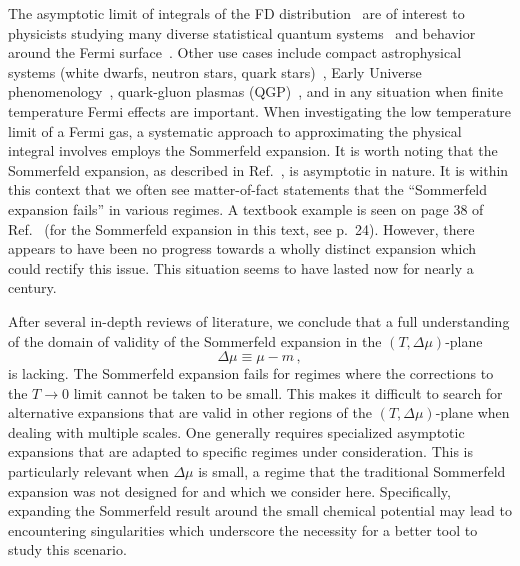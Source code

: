 \documentclass[sn-mathphys,Numbered]{sn-jnl}
\begin{document}
The asymptotic limit of integrals of the FD distribution~\cite{dingle1957fermi,dingle1973asymptotic} are of interest to physicists studying many diverse statistical quantum systems~\cite{10.1063/1.1350634,Lourenco:2007zza,10.1063/1.1665160,FUKUSHIMA2014417,GIL2022126618,GIL2023108563} and behavior around the Fermi surface~\cite{kim2008notes,PhysRevB.103.205154}. Other use cases include compact astrophysical systems (white dwarfs, neutron stars, quark stars)~\cite{Kaspi:2017fwg,Ferrer:2019xlr,Ferrer:2023pgq}, Early Universe phenomenology~\cite{Rafelski:2021aey,Rafelski:2023emw,Grayson:2023flr,Steinmetz:2023nsc}, quark-gluon plasmas (QGP)~\cite{Elze:1980er,Letessier:2002ony,Rafelski:2020ajx,Yang:2021bko}, and in any situation when finite temperature Fermi effects are important. When investigating the low temperature limit of a Fermi gas, a systematic approach to approximating the physical integral involves employs the Sommerfeld expansion. It is worth noting that the Sommerfeld expansion, as described in Ref.~\cite{landau2013statistical}, is asymptotic in nature. It is within this context that we often see matter-of-fact statements that the ``Sommerfeld expansion fails'' in various regimes. A textbook example is seen on page 38 of Ref.~\cite{Kuebler:2021Th} (for the Sommerfeld expansion in this text, see p.~24). However, there appears to have been no progress towards a wholly distinct expansion which could rectify this issue. This situation seems to have lasted now for nearly a century. 

After several in-depth reviews of literature, we conclude that a full understanding of the domain of validity of the Sommerfeld expansion in the $(T,\Delta\mu)$-plane
\begin{equation}\label{DeltaMu}
\Delta\mu\equiv \mu-m\,,
\end{equation}
is lacking. The Sommerfeld expansion fails for regimes where the corrections to the $T\rightarrow0$ limit cannot be taken to be small. This makes it difficult to search for alternative expansions that are valid in other regions of the $(T,\Delta\mu)$-plane when dealing with multiple scales. One generally requires specialized asymptotic expansions that are adapted to specific regimes under consideration. This is particularly relevant when $\Delta\mu$ is small, a regime that the traditional Sommerfeld expansion was not designed for and which we consider here. Specifically, expanding the Sommerfeld result around the small chemical potential may lead to encountering singularities which underscore the necessity for a better tool to study this scenario. 
\end{document}
